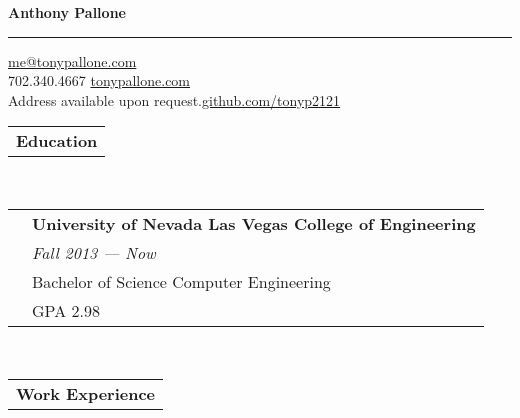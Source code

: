 \documentclass[12pt]{article}
\begin{document}
\begin{center}
\Huge {\bf Anthony Pallone}
\smallskip
\hrule
\smallskip
\normalsize{\href{mailto:me@tonypallone.com}{me@tonypallone.com}} \\
\smallskip
\normalsize{702.340.4667 \hfill
\href{https://tonypallone.com}{tonypallone.com}}
\\
\small Address available upon request.\hfill \normalsize \href{https://github.com/tonyp2121}{github.com/tonyp2121}
\end{center}
\raggedright{\begin{tabular}[b]{p{4.9cm}}
	\bf{\large{Education}} \\
    \cline{1-1}
\end{tabular}} \\
\smallskip \smallskip
\begin{tabular}[b]{p{1.3cm} p{13cm}}
	& \bf{University of Nevada Las Vegas College of Engineering}\\
	& \emph{\footnotesize{Fall 2013 --- Now}} \\
	& Bachelor of Science Computer Engineering\\
    & GPA 2.98 \\
\end{tabular}
\\
\medskip 		%
\raggedright{\begin{tabular}[b]{p{4.9cm}}
	\bf{\large{Work Experience}} \\
    \cline{1-1}
\end{tabular}}
\begin{tabular}[b]{p{1.3cm} p{13cm}}

\end{tabular}
\end{document}
